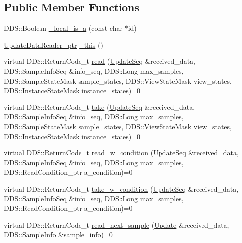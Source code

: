 \subsection*{Public Member Functions}
\begin{DoxyCompactItemize}
\item 
DDS::Boolean \hyperlink{classKnowledge_1_1UpdateDataReader_a2c0cf8dbc56adc069771319aaf4e68c5}{\_\-local\_\-is\_\-a} (const char $\ast$id)
\item 
\hyperlink{classKnowledge_1_1UpdateDataReader}{UpdateDataReader\_\-ptr} \hyperlink{classKnowledge_1_1UpdateDataReader_a2ba17dd4a2363ae8f26f9366a7eeb8f3}{\_\-this} ()
\item 
virtual DDS::ReturnCode\_\-t \hyperlink{classKnowledge_1_1UpdateDataReader_a85a1a349e1e65f5e356d5a0ad3133fe6}{read} (\hyperlink{namespaceKnowledge_ab62e46316b954f0d249e0e45de7059dc}{UpdateSeq} \&received\_\-data, DDS::SampleInfoSeq \&info\_\-seq, DDS::Long max\_\-samples, DDS::SampleStateMask sample\_\-states, DDS::ViewStateMask view\_\-states, DDS::InstanceStateMask instance\_\-states)=0
\item 
virtual DDS::ReturnCode\_\-t \hyperlink{classKnowledge_1_1UpdateDataReader_a4779729ac92314687c87b7a959c84af1}{take} (\hyperlink{namespaceKnowledge_ab62e46316b954f0d249e0e45de7059dc}{UpdateSeq} \&received\_\-data, DDS::SampleInfoSeq \&info\_\-seq, DDS::Long max\_\-samples, DDS::SampleStateMask sample\_\-states, DDS::ViewStateMask view\_\-states, DDS::InstanceStateMask instance\_\-states)=0
\item 
virtual DDS::ReturnCode\_\-t \hyperlink{classKnowledge_1_1UpdateDataReader_a0613fe0c358530af6b6eafb353775dbf}{read\_\-w\_\-condition} (\hyperlink{namespaceKnowledge_ab62e46316b954f0d249e0e45de7059dc}{UpdateSeq} \&received\_\-data, DDS::SampleInfoSeq \&info\_\-seq, DDS::Long max\_\-samples, DDS::ReadCondition\_\-ptr a\_\-condition)=0
\item 
virtual DDS::ReturnCode\_\-t \hyperlink{classKnowledge_1_1UpdateDataReader_a2cc66d38d8b528fcb76a8e8f5e4b9bfb}{take\_\-w\_\-condition} (\hyperlink{namespaceKnowledge_ab62e46316b954f0d249e0e45de7059dc}{UpdateSeq} \&received\_\-data, DDS::SampleInfoSeq \&info\_\-seq, DDS::Long max\_\-samples, DDS::ReadCondition\_\-ptr a\_\-condition)=0
\item 
virtual DDS::ReturnCode\_\-t \hyperlink{classKnowledge_1_1UpdateDataReader_a3a01192e6a4e66d03cd71dc3d5bcb5cf}{read\_\-next\_\-sample} (\hyperlink{structKnowledge_1_1Update}{Update} \&received\_\-data, DDS::SampleInfo \&sample\_\-info)=0
\item 

\end{DoxyCompactItemize}
